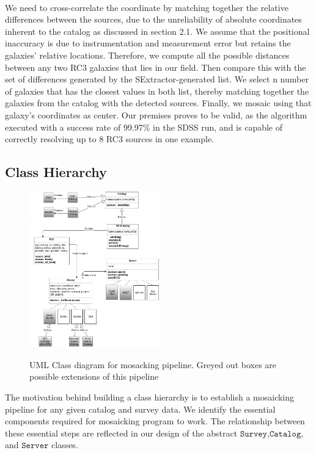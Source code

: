 \documentclass[5p]{elsarticle}
\begin{document}
\\
\indent  We need to cross-correlate the coordinate by matching together the relative differences between the sources, due to the unreliability of absolute coordinates inherent to the catalog as discussed in section 2.1. We assume that the positional inaccuracy is due to  instrumentation and measurement error but retains the galaxies' relative locations.  %
Therefore, we compute all the possible distances between any two RC3 galaxies that lies in our field. Then compare this with the set of differences generated by the SExtractor-generated list. We select n number of galaxies that has the closest values in both list, thereby matching together the galaxies from the catalog  with the detected sources. Finally, we mosaic using that galaxy's coordinates as center. Our premises proves to be valid, as the algorithm executed with a success rate of 99.97\% in the SDSS run, and is capable of correctly resolving up to 8 RC3 sources in one example.
	\subsection{Class Hierarchy}
	\begin{figure}[h]
		\includegraphics[width=0.5\textwidth]{figures/hierarchy}
		\label{fig:hierarchy}
		\caption{UML Class diagram for mosacking pipeline. Greyed out boxes are possible extensions of this pipeline}
	\end{figure}
 	The motivation behind building a class hierarchy is to establish a mosaicking pipeline for any given catalog and survey data. We identify the essential components required for mosaicking program to work. The relationship between these essential steps are reflected in our design of the abstract $\texttt{Survey}$,$\texttt{Catalog}$, and $\texttt{Server}$ classes. 
\end{document}
